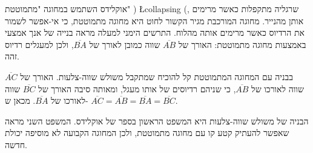 אוקלידס השתמש במחוגה "מתמוטטת" )%
\L{collapsing}%
(,
שרגליה מתקפלות כאשר מרימים אותן מהנייר. מחוגה המורכבת מגיר הקשור לחוט היא מחוגה מתמוטטת, כי אי-אפשר לשמור את הרדיוס כאשר מרימים אותה מהלוח. התרשים הימני למעלה מראה בנייה של אנך אמצעי באמצעות מחוגה מתמוטטת: האורך של
$\overline{AB}$
שווה כמובן לאורך של
$\overline{BA}$,
ולכן למעגלים רדיוס זהה.

בבניה עם המחוגה המתמוטטת קל להוכיח שמתקבל משולש שווה-צלעות. האורך של
$\overline{AC}$
שווה לאורכו של
$\overline{AB}$,
כי שניהם רדיוסים של אותו מעגל, ומאותה סיבה האורך של
$\overline{BC}$
שווה לאורכו של
$\overline{BA}$.
מכאן ש-%
$\overline{AC} = \overline{AB} = \overline{BA} = \overline{BC}$.
%
%

הבניה של משולש שווה-צלעות היא המשפט הראשון בספר של אוקלידס. המשפט השני מראה שאפשר להעתיק קטע קו עם מחוגה מתמוטטת, ולכן המחוגה הקבועה לא מוסיפה יכולת חדשה. 

